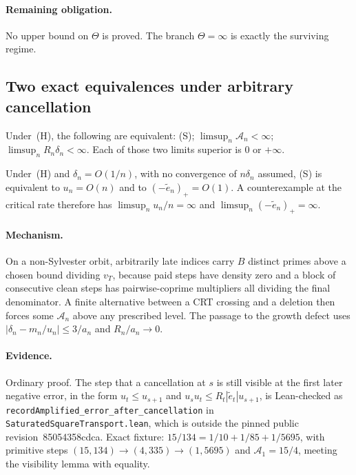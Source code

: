 \documentclass[11pt]{article}
\renewcommand{\commitshort}{85054358cdca}
\begin{document}
\paragraph{Remaining obligation.}
No upper bound on $\Theta$ is proved.  The branch $\Theta=\infty$ is exactly the
surviving regime.

\subsection{Two exact equivalences under arbitrary cancellation}

\begin{theorem}\label{long243:res:recordamplified}
Under~(H), the following are equivalent: (S); $\limsup_n\mathcal A_n<\infty$;
$\limsup_nR_n\delta_n<\infty$.  Each of those two limits superior is $0$ or
$+\infty$.
\end{theorem}

\begin{corollary}\label{long243:res:criticalrate}
Under~(H) and $\delta_n=O(1/n)$, with no convergence of $n\delta_n$ assumed,
(S) is equivalent to $u_n=O(n)$ and to $(-\tilde e_n)_+=O(1)$.  A
counterexample at the critical rate therefore has $\limsup_nu_n/n=\infty$ and
$\limsup_n(-\tilde e_n)_+=\infty$.
\end{corollary}

\paragraph{Mechanism.}
On a non-Sylvester orbit, arbitrarily late indices carry $B$ distinct primes
above a chosen bound dividing $v_T$, because paid steps have density zero and a
block of consecutive clean steps has pairwise-coprime multipliers all dividing
the final denominator.  A finite alternative between a CRT crossing and a
deletion then forces some $\mathcal A_n$ above any prescribed level.  The passage to the
growth defect uses $|\delta_n-m_n/u_n|\le3/a_n$ and $R_n/a_n\to0$.

\paragraph{Evidence.}
Ordinary proof.  The step that a cancellation at $s$ is still visible at the
first later negative error, in the form $u_t\le u_{s+1}$ and
$u_su_t\le R_t|\tilde e_t|u_{s+1}$, is Lean-checked as
\texttt{recordAmplified\_error\_after\_cancellation} in
\texttt{SaturatedSquareTransport.lean}, which is outside the pinned public
revision~\commitshort.  Exact fixture: $15/134=1/10+1/85+1/5695$, with primitive
steps $(15,134)\to(4,335)\to(1,5695)$ and $\mathcal A_1=15/4$, meeting the
visibility lemma with equality.
\end{document}
